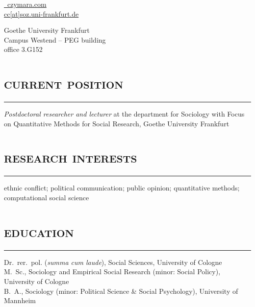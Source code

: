 \documentclass[11pt, a4paper]{article}
\title{}
\newcommand{\years}[1]{\marginnote{~~#1}}
\begin{document}
\author{\huge \textsc{Dr. Christian S. Czymara}}
\date{}
\maketitle
\begin{minipage}{0.5\textwidth}
\href{https://czymara.com}{\faLaptop~czymara.com}\\
\href{mailto:cc@soz.uni-frankfurt.de}{ cc[at]soz.uni-frankfurt.de}\\
\href{https://scholar.google.de/citations?user=khPqHmgAAAAJ}{\faGoogle} \href{https://github.com/czymara/}{\faGithub} \href{https://methodenderqu-ujz7851.slack.com/team/U010X1DBKMG}{\textcolor[rgb]{0,0,1}{\faSlack}} \href{https://twitter.com/cczymara}{\faTwitter}
\end{minipage}
\begin{minipage}{0.5\textwidth}
\begin{flushright}
Goethe University Frankfurt\\
Campus Westend -- PEG building\\
office 3.G152
\end{flushright}
\end{minipage}
\section*{\textsc{current position}}
\vskip-20pt{\noindent\rule{\textwidth}{1pt}}
\years{since 05/18}\textit{Postdoctoral researcher and lecturer} at the department for Sociology with Focus on Quantitative Methods for Social Research, Goethe University Frankfurt
\section*{\textsc{research interests}}
\vskip-20pt{\noindent\rule{\textwidth}{1pt}}
ethnic conflict; political communication; public opinion; quantitative methods; computational social science
\section*{\textsc{education}}
\vskip-20pt{\noindent\rule{\textwidth}{1pt}}
\noindent
\years{12/18}Dr.~rer.~pol. (\textit{summa cum laude}), Social Sciences, University of Cologne\\
\years{08/15}M.~Sc., Sociology and Empirical Social Research (minor: Social Policy), University of Cologne\\
\years{06/12}B.~A., Sociology (minor: Political Science \& Social Psychology), University of Mannheim
\end{document}

